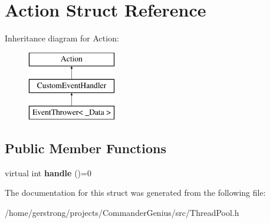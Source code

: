 \hypertarget{struct_action}{
\section{Action Struct Reference}
\label{struct_action}
}
Inheritance diagram for Action:\begin{figure}[H]
\begin{center}
\leavevmode
\includegraphics[height=3cm]{struct_action}
\end{center}
\end{figure}
\subsection*{Public Member Functions}
\begin{DoxyCompactItemize}
\item 
\hypertarget{struct_action_a078a4216b59caaec60832798b8b068ea}{
virtual int {\bfseries handle} ()=0}
\label{struct_action_a078a4216b59caaec60832798b8b068ea}

\end{DoxyCompactItemize}


The documentation for this struct was generated from the following file:\begin{DoxyCompactItemize}
\item 
/home/gerstrong/projects/CommanderGenius/src/ThreadPool.h\end{DoxyCompactItemize}

